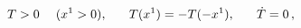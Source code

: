 \begin{equation}
 T>0 \hspace{3ex} (x^1>0), \hspace{4ex}
 T(x^1)=-T(-x^1), \hspace{4ex}
 \dot{T}=0 \,, \label{IC}
\end{equation}

